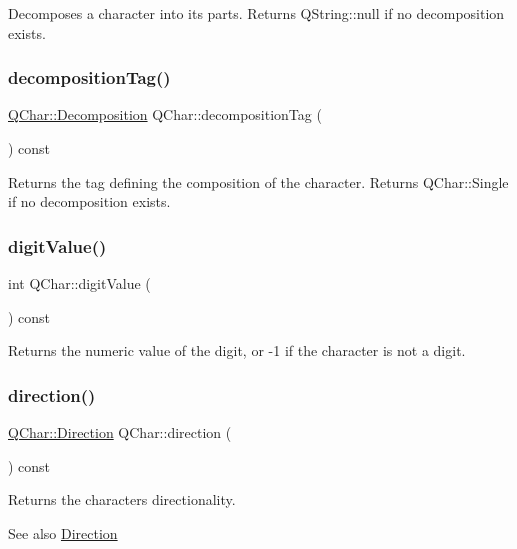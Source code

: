 Decomposes a character into its parts. Returns Q\+String\+::null if no decomposition exists. \mbox{\label{class_q_char_a1693892912196124bbdbe9b1b14da080}} 
\subsubsection{\texorpdfstring{decompositionTag()}{decompositionTag()}}
{\footnotesize\ttfamily \mbox{\hyperlink{class_q_char_a13be45046e82a6d2991cef0b7c18d522}{Q\+Char\+::\+Decomposition}} Q\+Char\+::decomposition\+Tag (\begin{DoxyParamCaption}{ }\end{DoxyParamCaption}) const}

Returns the tag defining the composition of the character. Returns Q\+Char\+::\+Single if no decomposition exists. \mbox{\label{class_q_char_ac23377922296b84ca58ffaaee6d522af}} 
\subsubsection{\texorpdfstring{digitValue()}{digitValue()}}
{\footnotesize\ttfamily int Q\+Char\+::digit\+Value (\begin{DoxyParamCaption}{ }\end{DoxyParamCaption}) const}

Returns the numeric value of the digit, or -\/1 if the character is not a digit. \mbox{\label{class_q_char_ad01050969cdddf81a9d956a93da209c6}} 
\subsubsection{\texorpdfstring{direction()}{direction()}}
{\footnotesize\ttfamily \mbox{\hyperlink{class_q_char_a54978126be7630b3e85394325a822302}{Q\+Char\+::\+Direction}} Q\+Char\+::direction (\begin{DoxyParamCaption}{ }\end{DoxyParamCaption}) const}

Returns the characters directionality.

\begin{DoxySeeAlso}{See also}
\mbox{\hyperlink{class_q_char_a54978126be7630b3e85394325a822302}{Direction}} 
\end{DoxySeeAlso}
\mbox{\label{class_q_char_a5758b5318fe28041c0729dded5b1b44e}} 
